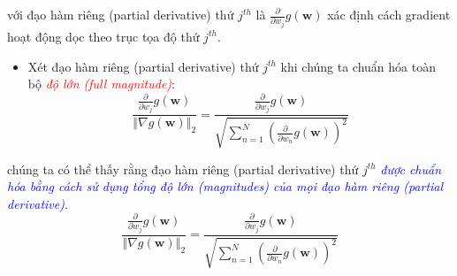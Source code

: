 \documentclass{book}
\begin{document}
với đạo hàm riêng (partial derivative) thứ $j^{th}$ là $\frac{\partial}{\partial w_j}g\left(\mathbf{w}\right)$ xác định cách gradient hoạt động dọc theo trục tọa độ thứ $j^{th}$.
\begin{itemize}
    \item Xét đạo hàm riêng (partial derivative) thứ $j^{th}$ khi chúng ta chuẩn hóa toàn bộ \textit{\textcolor{red}{độ lớn (full magnitude)}}:
    \begin{equation*}
        \frac{\frac{\partial}{\partial w_j}g\left(\mathbf{w}\right)}{\left\Vert \nabla g\left(\mathbf{w}\right) \right\Vert_2} = \frac{\frac{\partial}{\partial w_j}g\left(\mathbf{w}\right)}{\sqrt{\sum_{n=1}^N \left(\frac{\partial}{\partial w_n}g\left(\mathbf{w}\right)\right)^2}}
    \end{equation*}
\end{itemize}
chúng ta có thể thấy rằng đạo hàm riêng (partial derivative) thứ $j^{th}$ \textit{\textcolor{blue}{được chuẩn hóa bằng cách sử dụng tổng độ lớn (magnitudes) của mọi đạo hàm riêng (partial derivative)}}.    
\begin{equation*}
    \frac{\frac{\partial}{\partial w_j}g\left(\mathbf{w}\right)}{\left\Vert \nabla g\left(\mathbf{w}\right) \right\Vert_2} = \frac{\frac{\partial}{\partial w_j}g\left(\mathbf{w}\right)}{\sqrt{\sum_{n=1}^N \left(\frac{\partial}{\partial w_n}g\left(\mathbf{w}\right)\right)^2}}
\end{equation*}
\end{document}
